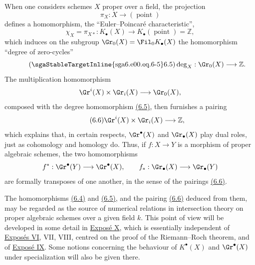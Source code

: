 When one considers schemes $X$ proper over a field, the projection
\[
\pi_X:X\longrightarrow (\operatorname{point})
\]
defines a homomorphism, the ``Euler--Poincar\'e characteristic'',
\begin{equation}\tag{6.4}
\chi_X=\pi_{X*}:K_\bullet(X)\longrightarrow K_\bullet(\operatorname{point})=\mathbb Z,
\end{equation}
which induces on the subgroup $\Gr_0(X)=\Fil_0K_\bullet(X)$ the homomorphism ``degree of zero-cycles''
\begin{equation}\tag{\sgaStableTargetInline{sga6.e00.eq.6-5}6.5}
\deg_X:\Gr_0(X)\longrightarrow \mathbb Z.
\end{equation}
The multiplication homomorphism
\[
\Gr^i(X)\times \Gr_i(X)\longrightarrow \Gr_0(X),
\]
composed with the degree homomorphism \hyperlink{sga6.e00.eq.6-5}{(6.5)}, then furnishes a pairing
\begin{equation}\tag{6.6}
\Gr^i(X)\times \Gr_i(X)\longrightarrow \mathbb Z,
\end{equation}
which explains that, in certain respects, $\Gr^\bullet(X)$ and $\Gr_\bullet(X)$ play dual roles, just as cohomology and homology do. Thus, if $f:X\to Y$ is a morphism of proper algebraic schemes, the two homomorphisms
\[
f^*:\Gr^\bullet(Y)\longrightarrow \Gr^\bullet(X),\qquad f_*:\Gr_\bullet(X)\longrightarrow \Gr_\bullet(Y)
\]
are formally transposes of one another, in the sense of the pairings \hyperlink{sga6.e00.eq.6-6}{(6.6)}.

The homomorphisms \hyperlink{sga6.e00.eq.6-4}{(6.4)} and \hyperlink{sga6.e00.eq.6-5}{(6.5)}, and the pairing \hyperlink{sga6.e00.eq.6-6}{(6.6)} deduced from them, may be regarded as the source of numerical relations in intersection theory on proper algebraic schemes over a given field $k$. This point of view will be developed in some detail in \hyperlink{sga6.e10.expose}{Expos\'e X}, which is essentially independent of \hyperlink{sga6.e06.expose}{Expos\'es VI}, VII, VIII, centred on the proof of the Riemann--Roch theorem, and of \hyperlink{sga6.e09.expose}{Expos\'e IX}. Some notions concerning the behaviour of $K^\bullet(X)$ and $\Gr^\bullet(X)$ under specialization will also be given there.

